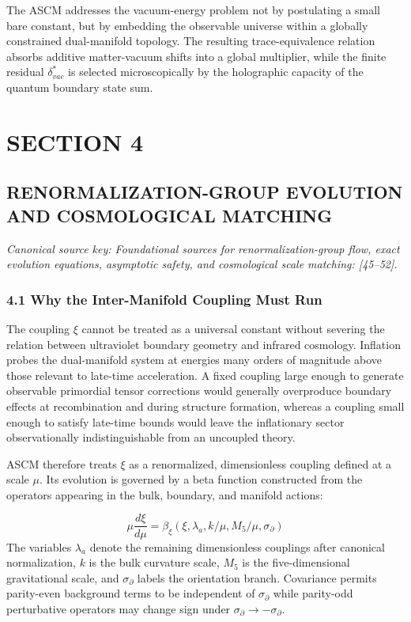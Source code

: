 \documentclass[aps,prd,onecolumn,superscriptaddress,nofootinbib,longbibliography,10pt]{revtex4-2}
\begin{document}
  The ASCM addresses the vacuum-energy problem not by postulating a small bare constant, but by embedding the observable universe within a globally constrained dual-manifold topology. The resulting trace-equivalence relation absorbs additive matter-vacuum shifts into a global multiplier, while the finite residual \(\delta_{vac}^*\) is selected microscopically by the holographic capacity of the quantum boundary state sum.




 

  
\section*{SECTION 4}

  
\subsection*{RENORMALIZATION-GROUP EVOLUTION AND COSMOLOGICAL MATCHING}

  \textit{Canonical source key: Foundational sources for renormalization-group flow, exact evolution equations, asymptotic safety, and cosmological scale matching: [45–52].}


  
\subsubsection*{4.1 Why the Inter-Manifold Coupling Must Run}

  The coupling \(\xi\) cannot be treated as a universal constant without severing the relation between ultraviolet boundary geometry and infrared cosmology. Inflation probes the dual-manifold system at energies many orders of magnitude above those relevant to late-time acceleration. A fixed coupling large enough to generate observable primordial tensor corrections would generally overproduce boundary effects at recombination and during structure formation, whereas a coupling small enough to satisfy late-time bounds would leave the inflationary sector observationally indistinguishable from an uncoupled theory.


  ASCM therefore treats \(\xi\) as a renormalized, dimensionless coupling defined at a scale \(\mu\). Its evolution is governed by a beta function constructed from the operators appearing in the bulk, boundary, and manifold actions:


  \[ \mu \frac{d\xi}{d\mu} = \beta_\xi(\xi, \lambda_a, k/\mu, M_5/\mu, \sigma_\partial) \]
  The variables \(\lambda_a\) denote the remaining dimensionless couplings after canonical normalization, \(k\) is the bulk curvature scale, \(M_5\) is the five-dimensional gravitational scale, and \(\sigma_\partial\) labels the orientation branch. Covariance permits parity-even background terms to be independent of \(\sigma_\partial\) while parity-odd perturbative operators may change sign under \(\sigma_\partial \to -\sigma_\partial\).
\end{document}

